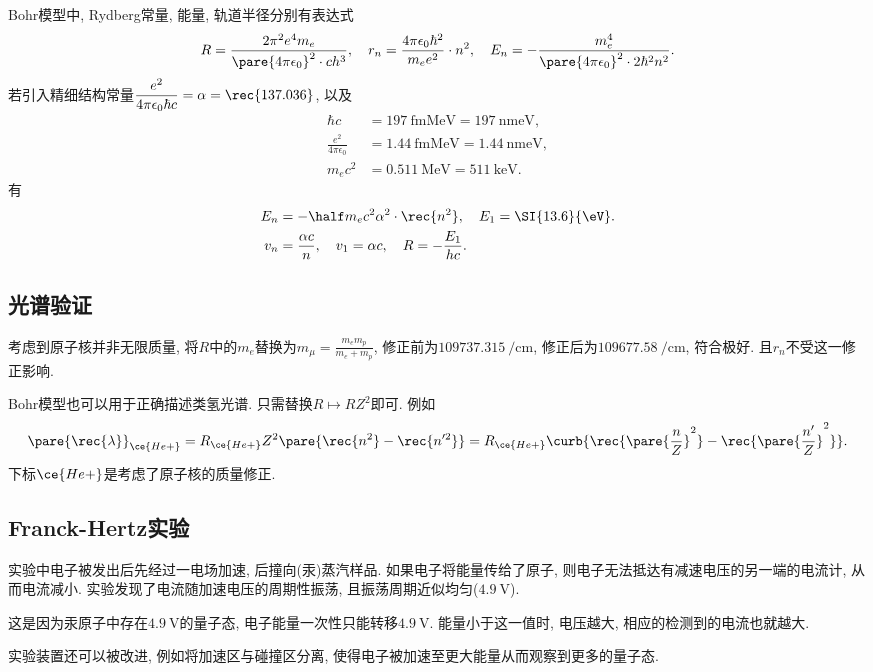 \documentclass{ctexart}
\begin{document}
Bohr模型中, Rydberg常量, 能量, 轨道半径分别有表达式
\[ R = \frac{2\pi^2 e^4m_e}{\pare{4\pi\epsilon_0}^2\cdot ch^3}, \quad r_n = \frac{4\pi\epsilon_0 \hbar^2}{m_e e^2}\cdot n^2,\quad E_n = -\frac{m_ e^4}{\pare{4\pi\epsilon_0}^2\cdot 2\hbar^2 n^2}. \]
若引入精细结构常量$\displaystyle \frac{e^2}{4\pi\epsilon_0\hbar c} = \alpha = \rec{137.036}$, 以及
\begin{align*}
    \hbar c &= \SI{197}{\femto\meter\mega\eV} = \SI{197}{\nano\meter\eV}, \\
    \frac{e^2}{4\pi\epsilon_0} &= \SI{1.44}{\femto\meter\mega\eV} = \SI{1.44}{\nano\meter\eV}, \\
    m_ec^2 &= \SI{0.511}{\mega\eV} = \SI{511}{\kilo\eV}.
\end{align*}
有
\begin{align*}
    E_n &= -\half m_ec^2\alpha^2 \cdot \rec{n^2},\quad E_1 = \SI{13.6}{\eV}. \\
    v_n &= \frac{\alpha c}{n},\quad v_1 = \alpha c,\quad R = -\frac{E_1}{hc}.
\end{align*}


\subsection{光谱验证} %
\label{sub:光谱验证}

考虑到原子核并非无限质量, 将$R$中的$m_e$替换为$\displaystyle m_\mu = \frac{m_em_p}{m_e+m_p}$, 修正前为$\SI{109737.315}{\per\centi\meter}$, 修正后为$\SI{109677.58}{\per\centi\meter}$, 符合极好. 且$r_n$不受这一修正影响.
\par
Bohr模型也可以用于正确描述类氢光谱. 只需替换$R\mapsto RZ^2$即可. 例如
\[ \pare{\rec{\lambda}}_{\ce{He+}} = R_{\ce {He+}} Z^2 \pare{\rec{n^2} - \rec{n'^2}} = R_{\ce{He+}}\curb{\rec{\pare{\frac{n}{Z}}^2} - \rec{\pare{\frac{n'}{Z}}^2}}. \]
下标$\ce{He+}$是考虑了原子核的质量修正.


\subsection{Franck-Hertz实验} %
\label{sub:franck_hertz实验}

实验中电子被发出后先经过一电场加速, 后撞向(汞)蒸汽样品. 如果电子将能量传给了原子, 则电子无法抵达有减速电压的另一端的电流计, 从而电流减小. 实验发现了电流随加速电压的周期性振荡, 且振荡周期近似均匀($\SI{4.9}{\volt}$).
\par
这是因为汞原子中存在$\SI{4.9}{\volt}$的量子态, 电子能量一次性只能转移$\SI{4.9}{\volt}$. 能量小于这一值时, 电压越大, 相应的检测到的电流也就越大.
\par
实验装置还可以被改进, 例如将加速区与碰撞区分离, 使得电子被加速至更大能量从而观察到更多的量子态.
\end{document}
